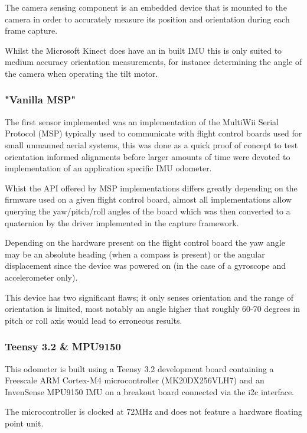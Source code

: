 \documentclass{entcs}
\begin{document}
The camera sensing component is an embedded device that is mounted to the camera
in order to accurately measure its position and orientation during each frame
capture.

Whilst the Microsoft Kinect does have an in built IMU this is only suited to
medium accuracy orientation measurements, for instance determining the angle of
the camera when operating the tilt motor.

\subsubsection{"Vanilla MSP"}

The first sensor implemented was an implementation of the MultiWii Serial
Protocol (MSP) typically used to communicate with flight control boards used
for small unmanned aerial systems, this was done as a quick proof of concept to
test orientation informed alignments before larger amounts of time were devoted
to implementation of an application specific IMU odometer.

Whist the API offered by MSP implementations differs greatly depending on the
firmware used on a given flight control board, almost all implementations allow
querying the yaw/pitch/roll angles of the board which was then converted to a
quaternion by the driver implemented in the capture framework.

Depending on the hardware present on the flight control board the yaw angle may
be an absolute heading (when a compass is present) or the angular displacement
since the device was powered on (in the case of a gyroscope and accelerometer
only).

This device has two significant flaws; it only senses orientation and the range
of orientation is limited, most notably an angle higher that roughly 60-70
degrees in pitch or roll axis would lead to erroneous results.

\subsubsection{Teensy 3.2 \& MPU9150}

This odometer is built using a Teensy 3.2 \cite{teensy32} development board
containing a Freescale ARM Cortex-M4 microcontroller (MK20DX256VLH7) and an
InvenSense MPU9150 IMU on a breakout board connected via the i2c interface.

The microcontroller is clocked at 72MHz and does not feature a hardware floating
point unit.
\end{document}
